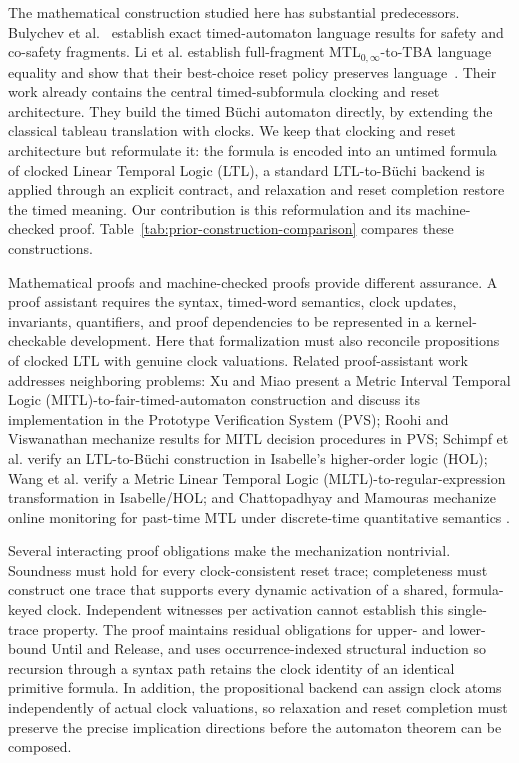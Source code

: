 \documentclass{ieeeaccess}
\begin{document}
The mathematical construction studied here has substantial predecessors.
Bulychev et al.~\cite{[BDLG14]} establish exact timed-automaton language results for safety
and co-safety fragments. Li et al. establish full-fragment
MTL$_{0,\infty}$-to-TBA language equality and show that their best-choice
reset policy preserves language~\cite{[BDLG14],li_spin7}. Their
work already contains the central timed-subformula clocking and reset
architecture. They build the timed B\"uchi automaton directly, by extending the
classical tableau translation with clocks. We keep that clocking and reset
architecture but reformulate it: the formula is encoded into an untimed formula of clocked Linear Temporal Logic (LTL), a standard LTL-to-B\"uchi backend is applied through an
explicit contract, and relaxation and reset completion restore the timed
meaning. Our contribution is this reformulation and its machine-checked proof.
Table~\ref{tab:prior-construction-comparison} compares these
constructions.

Mathematical proofs and machine-checked proofs provide different assurance.
A proof assistant requires the syntax, timed-word semantics, clock updates,
invariants, quantifiers, and proof dependencies to be represented in a
kernel-checkable development. Here that formalization must also reconcile
propositions of clocked LTL with genuine clock
valuations. Related proof-assistant
work addresses neighboring problems: Xu and Miao present a Metric Interval
Temporal Logic (MITL)-to-fair-timed-automaton construction and discuss its
implementation in the Prototype Verification System (PVS); Roohi and
Viswanathan mechanize results for MITL decision procedures in PVS; Schimpf et
al. verify an LTL-to-B\"uchi construction in Isabelle's higher-order logic
(HOL); Wang et al. verify a
Metric Linear Temporal Logic (MLTL)-to-regular-expression transformation in
Isabelle/HOL; and Chattopadhyay and Mamouras mechanize online monitoring for
past-time MTL under discrete-time quantitative semantics
\cite{xu08,roohi_viswanathan_vmcai18,schimpf_tphols09,
wang_mltl_tacas25,chattopadhyay_mamouras_rv20}.

Several interacting proof obligations make the mechanization nontrivial.
Soundness must hold for every clock-consistent reset trace;
completeness must construct one trace that supports every dynamic activation
of a shared, formula-keyed clock. Independent witnesses per activation cannot
establish this single-trace property. The proof maintains residual obligations
for upper- and lower-bound Until and Release, and uses occurrence-indexed
structural induction so recursion through a syntax path retains the clock
identity of an identical primitive formula. In addition, the propositional backend can
assign clock atoms independently of actual clock valuations, so relaxation
and reset completion must preserve the precise implication directions before
the automaton theorem can be composed.
\end{document}
